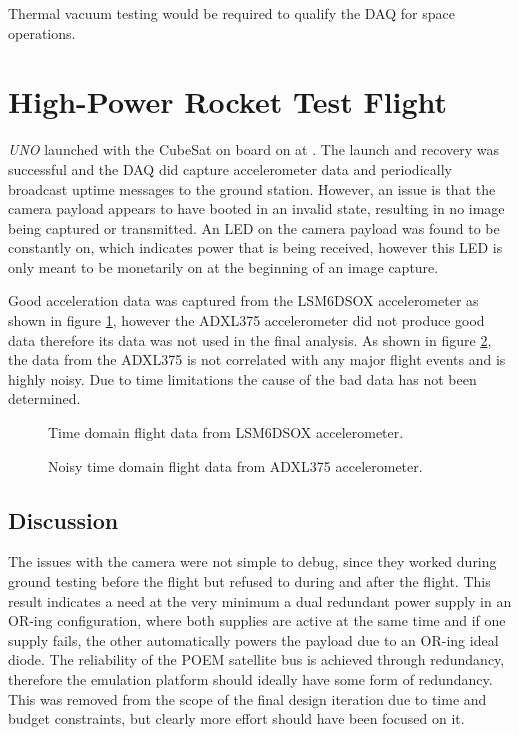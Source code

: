 \documentclass{report}
\begin{document}
Thermal vacuum testing would be required to qualify the DAQ for space operations.

\section{High-Power Rocket Test Flight}

\textit{UNO} launched with the CubeSat on board on  at . The launch and recovery was successful and the DAQ did capture accelerometer data and periodically broadcast uptime messages to the ground station. However, an issue is that the camera payload appears to have booted in an invalid state, resulting in no image being captured or transmitted. An LED on the camera payload was found to be constantly on, which indicates power that is being received, however this LED is only meant to be monetarily on at the beginning of an image capture.

Good acceleration data was captured from the LSM6DSOX accelerometer as shown in figure \ref{fig:flight-16g-time-domain}, however the ADXL375 accelerometer did not produce good data therefore its data was not used in the final analysis. As shown in figure \ref{fig:flight-200g-time-domain}, the data from the ADXL375 is not correlated with any major flight events and is highly noisy. Due to time limitations the cause of the bad data has not been determined.

\begin{figure}[H]
  \centering
  
  \caption{Time domain flight data from LSM6DSOX accelerometer.}
  \label{fig:flight-16g-time-domain}
\end{figure}

\begin{figure}[H]
  \centering
  
  \caption{Noisy time domain flight data from ADXL375 accelerometer.}
  \label{fig:flight-200g-time-domain}
\end{figure}

\subsection{Discussion}

The issues with the camera were not simple to debug, since they worked during ground testing before the flight but refused to during and after the flight. This result indicates a need at the very minimum a dual redundant power supply in an OR-ing configuration, where both supplies are active at the same time and if one supply fails, the other automatically powers the payload due to an OR-ing ideal diode. The reliability of the POEM satellite bus is achieved through redundancy, therefore the emulation platform should ideally have some form of redundancy. This was removed from the scope of the final design iteration due to time and budget constraints, but clearly more effort should have been focused on it.
\end{document}
